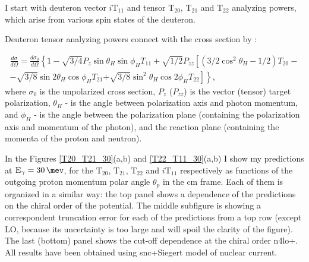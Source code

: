     I start with deuteron vector $i\text{T}_{11}$ and tensor $\text{T}_{20}$, $\text{T}_{21}$ and $\text{T}_{22}$
    analyzing powers, which arise from various spin states of the deuteron.
    
    Deuteron tensor analyzing powers connect with the cross section by \cite{rachek2007}:
    
    \begin{eqnarray}
            \frac{d \sigma}{d \Omega}= \frac{d \sigma_0}{d \Omega}\left\{1-\sqrt{3 / 4} P_z \sin \theta_H \sin \phi_H T_{11}\right.
            +\sqrt{1 / 2} P_{z z}\left[\left(3 / 2 \cos ^2 \theta_H-1 / 2\right) T_{20}\right. - \nonumber \\
            -\sqrt{3 / 8} \sin 2 \theta_H \cos \phi_H T_{21} 
            \left.\left.+\sqrt{3 / 8} \sin ^2 \theta_H \cos 2 \phi_H T_{22}\right]\right\},
    \end{eqnarray}
    where $\sigma_0$ is the unpolarized cross section, $P_z$ ($P_{zz}$)
    is the vector (tensor) target polarization, $\theta_H$ - is the angle
    between polarization axis and photon momentum,
    and $\phi_H$ - is the angle between the polarization plane 
    (containing the polarization axis and momentum of the photon),
    and the reaction plane (containing the momenta of the proton
    and neutron).

    In the Figures \ref{T20_T21_30}(a,b) and \ref{T22_T11_30}(a,b)
    I show my predictions at $\text{E}_\gamma = \SI{30}{\mev}$, for the
    $\text{T}_{20}$, $\text{T}_{21}$, $\text{T}_{22}$  and $i\text{T}_{11}$ respectively as functions 
    of the outgoing proton momentum polar angle $\theta_p$ in the \gls{cm} frame. Each of them
    is organized in a similar way: the top
    panel shows a dependence of the predictions on the 
    chiral order of the potential. The middle subfigure is
    showing a correspondent truncation error for each of the 
    predictions from a top row (except LO, because its uncertainty is
    too large and will spoil the clarity of the figure). The last (bottom)
    panel shows the cut-off dependence at the chiral
    order \gls{n4lo+}. 
    All results have been obtained using \gls{snc}+Siegert model of nuclear current.

